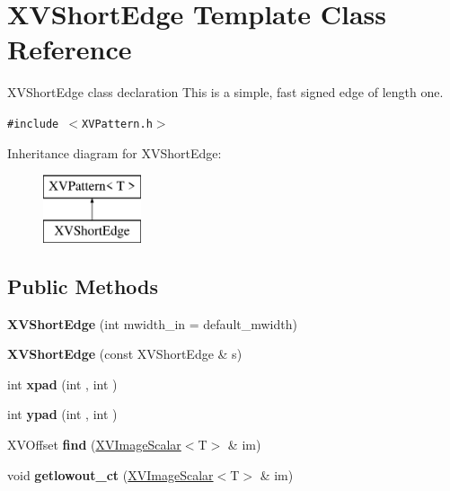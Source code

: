 \hypertarget{class_XVShortEdge}{
\section{XVShort\-Edge  Template Class Reference}
\label{XVShortEdge}
}
XVShort\-Edge class declaration This is a simple, fast signed edge of length one. 


{\tt \#include $<$XVPattern.h$>$}

Inheritance diagram for XVShort\-Edge:\begin{figure}[H]
\begin{center}
\leavevmode
\includegraphics[height=2cm]{class_XVShortEdge}
\end{center}
\end{figure}
\subsection*{Public Methods}
\begin{CompactItemize}
\item 
\label{XVShortEdge_a0}
\hypertarget{class_XVShortEdge_a0}{
{\bf XVShort\-Edge} (int mwidth\_\-in = default\_\-mwidth)}

\item 
{\bf XVShort\-Edge} (const XVShort\-Edge \& s)
\item 
int {\bf xpad} (int , int )
\item 
int {\bf ypad} (int , int )
\item 
\label{XVShortEdge_a4}
\hypertarget{class_XVShortEdge_a4}{
XVOffset {\bf find} (\hyperlink{class_XVImageScalar}{XVImage\-Scalar}$<$T$>$ \& im)}

\item 
\label{XVShortEdge_a5}
\hypertarget{class_XVShortEdge_a5}{
void {\bf getlowout\_\-ct} (\hyperlink{class_XVImageScalar}{XVImage\-Scalar}$<$T$>$ \& im)}

\end{CompactItemize}
